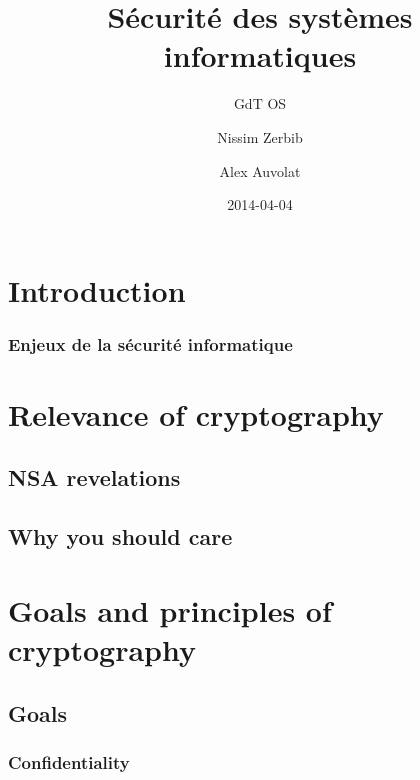 \documentclass[compress]{beamer}
\title{Sécurité des systèmes informatiques}
\subtitle{GdT OS}
\author{Nissim Zerbib \and Alex Auvolat}
\date{2014-04-04}
\theoremstyle{definition}
\theoremstyle{definition}
\theoremstyle{definition}
\theoremstyle{remark}
\theoremstyle{remark}
\theoremstyle{definition}
\theoremstyle{definition}
\theoremstyle{definition}
\theoremstyle{definition}
\theoremstyle{definition}
\theoremstyle{remark}
\theoremstyle{remark}
\theoremstyle{remark}
\theoremstyle{remark}
\begin{document}
		\maketitle
		\begin{frame}
		\tableofcontents
		\end{frame}
	
		\section*{Introduction}
			\begin{frame}
			\frametitle{Enjeux de la sécurité informatique}
			\end{frame}
		
		\section{Relevance of cryptography}\frame{\sectionpage}
			\subsection{NSA revelations}
			\begin{frame}
			\end{frame}
		\begin{frame}	
			\end{frame}
			\begin{frame}
			\end{frame}
			\subsection{Why you should care}
			\begin{frame}
			\end{frame}
			\begin{frame}
			\end{frame}
		\section{Goals and principles of cryptography}\frame{\sectionpage}
			\subsection{Goals}
				\subsubsection{Confidentiality}
				\begin{frame}
				\end{frame}
\end{document}

